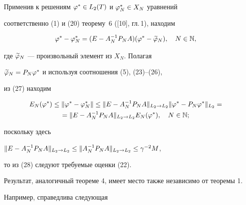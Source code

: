 \begin{pf}
Применив к решениям $\varphi^*\in L_2(T)$ и $\varphi_N^*\in X_N$ уравнений 


соответственно (1) и (20) теорему~6 ([10], гл.\,1), находим


\begin{equation}


\vp^*-\vp_N^* = (E-A_N^{-1}P_N A)(\vp^* - \widetilde{\vp}_N),\quad N\in \N,


\end{equation}


где $\widetilde{\varphi}_N$ --- произвольный элемент из $X_N$. Полагая 


$\widetilde{\varphi}_N=P_N\varphi^*$ и используя соотношения (5), (23)--(26), 


из (27) находим


\begin{multline}


E_N(\vp^*)\lea\|\vp^*-\vp_N^*\|\lea


\|E-A_N^{-1}P_N A\|_{L_2\to L_2}\|\vp^*-P_N\vp^*\|_{L_2}= \\ =


\|E - A_N^{-1}P_N A\|_{L_2\to L_2} E_N(\vp^*), \quad N\in\N;


\end{multline}


поскольку здесь


$\|E-A_N^{-1}P_N A\|_{L_2\to L_2}\lea\|A_N^{-1}P_N A\|_{L_2\to L_2}\lea


\gamma^{-2}M$,


то из (28) следуют требуемые оценки (22).


\end{pf}





Результат, аналогичный теореме 4, имеет место также независимо от теоремы 1. 


Например, справедлива следующая








